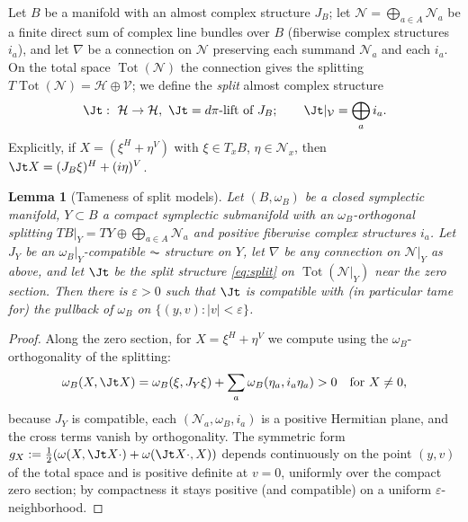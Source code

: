 \documentclass[11pt]{amsart}
\theoremstyle{plain}
\newtheorem{lemma}[theorem]{Lemma}
\theoremstyle{definition}
\newcommand{\NN}{\mathcal{N}}
\newcommand{\tot}{\operatorname{Tot}}
\begin{document}
Let $B$ be a manifold with an almost complex structure $J_B$; let
$\NN=\bigoplus_{a\in A}\NN_a$ be a finite direct sum of complex line bundles
over $B$ (fiberwise complex structures $i_a$), and let $\nabla$ be a connection
on $\NN$ preserving each summand $\NN_a$ and each $i_a$. On the total space
$\tot(\NN)$ the connection gives the splitting
$T\tot(\NN)=\mathcal H\oplus\mathcal V$; we define the \emph{split} almost
complex structure
\begin{equation}\label{eq:split}
\Jt:\ \mathcal H\to\mathcal H,\ \Jt=d\pi\text{-lift of }J_B;
\qquad \Jt|_{\mathcal V}=\bigoplus_a i_a .
\end{equation}
Explicitly, if $X=(\xi^H+\eta^V)$ with $\xi\in T_xB$, $\eta\in\NN_x$, then
$\Jt X=(J_B\xi)^H+(i\eta)^V$.

\begin{lemma}[Tameness of split models]\label{lem:tame}
Let $(B,\omega_B)$ be a closed symplectic manifold, $Y\subset B$ a compact
symplectic submanifold with an $\omega_B$-orthogonal splitting
$TB|_Y=TY\oplus\bigoplus_{a\in A}\NN_a$ and positive fiberwise complex
structures $i_a$. Let $J_Y$ be an $\omega_B|_Y$-compatible $\AC$ structure on
$Y$, let $\nabla$ be any connection on $\NN|_Y$ as above, and let $\Jt$ be the
split structure \eqref{eq:split} on $\tot(\NN|_Y)$ near the zero section. Then
there is $\varepsilon>0$ such that $\Jt$ is compatible with (in particular
tame for) the pullback of $\omega_B$ on
$\{(y,v): |v|<\varepsilon\}$.
\end{lemma}

\begin{proof}
Along the zero section, for $X=\xi^H+\eta^V$ we compute using the
$\omega_B$-orthogonality of the splitting:
\[
\omega_B(X,\Jt X)=\omega_B(\xi,J_Y\xi)+\sum_a\omega_B(\eta_a,i_a\eta_a)>0
\quad\text{for }X\neq0,
\]
because $J_Y$ is compatible, each $(\NN_a,\omega_B,i_a)$ is a positive
Hermitian plane, and the cross terms vanish by orthogonality. The symmetric
form $g_X{}{}:=\frac12(\omega(X,\Jt X\cdot)+\omega(\Jt X\cdot,X))$ depends
continuously on the point $(y,v)$ of the total space and is positive definite
at $v=0$, uniformly over the compact zero section; by compactness it stays
positive (and compatible) on a uniform $\varepsilon$-neighborhood.
\end{proof}
\end{document}
